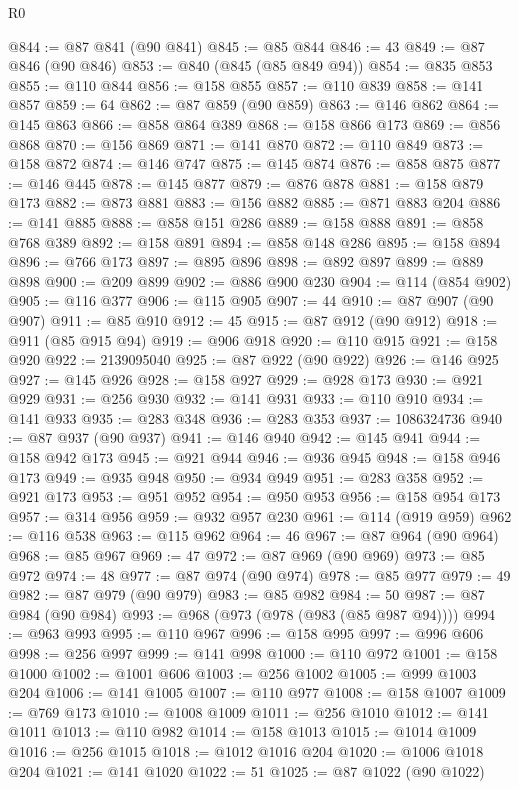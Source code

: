 \begin{lexlean}{R0}
\begin{coremodule}
@844 := @87 @841 (@90 @841)
@845 := @85 @844
@846 := 43
@849 := @87 @846 (@90 @846)
@853 := @840 (@845 (@85 @849 @94))
@854 := @835 @853
@855 := @110 @844
@856 := @158 @855
@857 := @110 @839
@858 := @141 @857
@859 := 64
@862 := @87 @859 (@90 @859)
@863 := @146 @862
@864 := @145 @863
@866 := @858 @864 @389
@868 := @158 @866 @173
@869 := @856 @868
@870 := @156 @869
@871 := @141 @870
@872 := @110 @849
@873 := @158 @872
@874 := @146 @747
@875 := @145 @874
@876 := @858 @875
@877 := @146 @445
@878 := @145 @877
@879 := @876 @878
@881 := @158 @879 @173
@882 := @873 @881
@883 := @156 @882
@885 := @871 @883 @204
@886 := @141 @885
@888 := @858 @151 @286
@889 := @158 @888
@891 := @858 @768 @389
@892 := @158 @891
@894 := @858 @148 @286
@895 := @158 @894
@896 := @766 @173
@897 := @895 @896
@898 := @892 @897
@899 := @889 @898
@900 := @209 @899
@902 := @886 @900 @230
@904 := @114 (@854 @902)
@905 := @116 @377
@906 := @115 @905
@907 := 44
@910 := @87 @907 (@90 @907)
@911 := @85 @910
@912 := 45
@915 := @87 @912 (@90 @912)
@918 := @911 (@85 @915 @94)
@919 := @906 @918
@920 := @110 @915
@921 := @158 @920
@922 := 2139095040
@925 := @87 @922 (@90 @922)
@926 := @146 @925
@927 := @145 @926
@928 := @158 @927
@929 := @928 @173
@930 := @921 @929
@931 := @256 @930
@932 := @141 @931
@933 := @110 @910
@934 := @141 @933
@935 := @283 @348
@936 := @283 @353
@937 := 1086324736
@940 := @87 @937 (@90 @937)
@941 := @146 @940
@942 := @145 @941
@944 := @158 @942 @173
@945 := @921 @944
@946 := @936 @945
@948 := @158 @946 @173
@949 := @935 @948
@950 := @934 @949
@951 := @283 @358
@952 := @921 @173
@953 := @951 @952
@954 := @950 @953
@956 := @158 @954 @173
@957 := @314 @956
@959 := @932 @957 @230
@961 := @114 (@919 @959)
@962 := @116 @538
@963 := @115 @962
@964 := 46
@967 := @87 @964 (@90 @964)
@968 := @85 @967
@969 := 47
@972 := @87 @969 (@90 @969)
@973 := @85 @972
@974 := 48
@977 := @87 @974 (@90 @974)
@978 := @85 @977
@979 := 49
@982 := @87 @979 (@90 @979)
@983 := @85 @982
@984 := 50
@987 := @87 @984 (@90 @984)
@993 := @968 (@973 (@978 (@983 (@85 @987 @94))))
@994 := @963 @993
@995 := @110 @967
@996 := @158 @995
@997 := @996 @606
@998 := @256 @997
@999 := @141 @998
@1000 := @110 @972
@1001 := @158 @1000
@1002 := @1001 @606
@1003 := @256 @1002
@1005 := @999 @1003 @204
@1006 := @141 @1005
@1007 := @110 @977
@1008 := @158 @1007
@1009 := @769 @173
@1010 := @1008 @1009
@1011 := @256 @1010
@1012 := @141 @1011
@1013 := @110 @982
@1014 := @158 @1013
@1015 := @1014 @1009
@1016 := @256 @1015
@1018 := @1012 @1016 @204
@1020 := @1006 @1018 @204
@1021 := @141 @1020
@1022 := 51
@1025 := @87 @1022 (@90 @1022)

\end{coremodule}
\end{lexlean}
